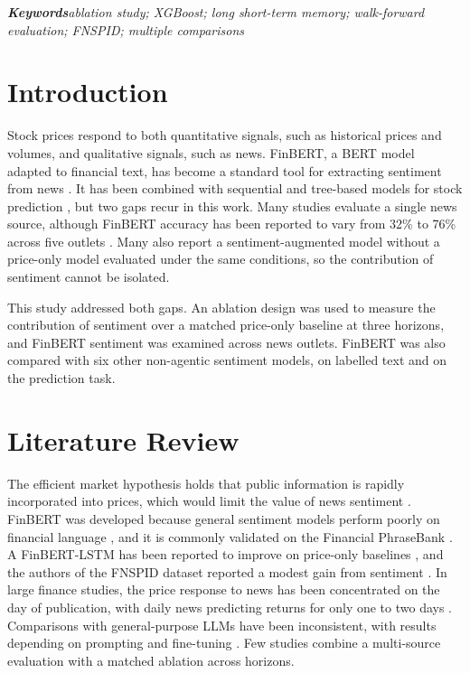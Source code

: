 \documentclass[a4paper,11pt]{article}
\begin{document}
\vspace{6pt}
\textbf{\textit{Keywords}}\quad \textit{ablation study; XGBoost; long short-term memory; walk-forward evaluation; FNSPID; multiple comparisons}

\section{Introduction}
Stock prices respond to both quantitative signals, such as historical prices and volumes, and qualitative signals, such as news. FinBERT, a BERT model adapted to financial text, has become a standard tool for extracting sentiment from news \cite{araci2019finbert}. It has been combined with sequential and tree-based models for stock prediction \cite{gu2024predicting,mathematics2025stock}, but two gaps recur in this work. Many studies evaluate a single news source, although FinBERT accuracy has been reported to vary from 32\% to 76\% across five outlets \cite{liu2025enhancing}. Many also report a sentiment-augmented model without a price-only model evaluated under the same conditions, so the contribution of sentiment cannot be isolated.

This study addressed both gaps. An ablation design was used to measure the contribution of sentiment over a matched price-only baseline at three horizons, and FinBERT sentiment was examined across news outlets. FinBERT was also compared with six other non-agentic sentiment models, on labelled text and on the prediction task.

\section{Literature Review}
The efficient market hypothesis holds that public information is rapidly incorporated into prices, which would limit the value of news sentiment \cite{fama1970efficient}. FinBERT was developed because general sentiment models perform poorly on financial language \cite{araci2019finbert,yang2020finbert}, and it is commonly validated on the Financial PhraseBank \cite{malo2014good}. A FinBERT-LSTM has been reported to improve on price-only baselines \cite{gu2024predicting}, and the authors of the FNSPID dataset reported a modest gain from sentiment \cite{dong2024fnspid}. In large finance studies, the price response to news has been concentrated on the day of publication, with daily news predicting returns for only one to two days \cite{heston2017news,ke2019predicting}. Comparisons with general-purpose LLMs have been inconsistent, with results depending on prompting and fine-tuning \cite{fatouros2023transforming,arxiv2024optimizing}. Few studies combine a multi-source evaluation with a matched ablation across horizons.
\end{document}
